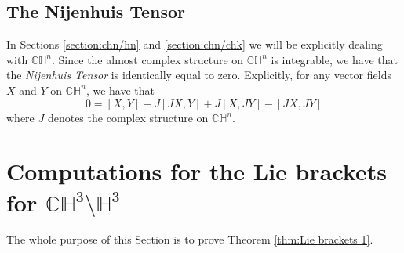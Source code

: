\documentclass[10pt]{amsart}
\def\H{\mathbb{H}}
\def\C{\mathbb{C}}
\theoremstyle{definition}
\theoremstyle{remark}
\numberwithin{equation}{section}
\begin{document}
\subsection{The Nijenhuis Tensor}
In Sections \ref{section:chn/hn} and \ref{section:chn/chk} we will be explicitly dealing with $\C \H^n$.  
Since the almost complex structure on $\C \H^n$ is integrable, we have that the {\em Nijenhuis Tensor} is identically equal to zero.  
Explicitly, for any vector fields $X$ and $Y$ on $\C \H^n$, we have that
	\begin{equation}\label{eqn:Nijenhuis tensor}
	0 = [X,Y] + J[JX,Y] + J[X,JY] - [JX,JY]
	\end{equation}
where $J$ denotes the complex structure on $\C \H^n$.  












\vskip 20pt

\section{Computations for the Lie brackets for $\C \H^3 \setminus \H^3$}\label{section:proof of Lie brackets 1}

\vskip 10pt

The whole purpose of this Section is to prove Theorem \ref{thm:Lie brackets 1}.
\end{document}
